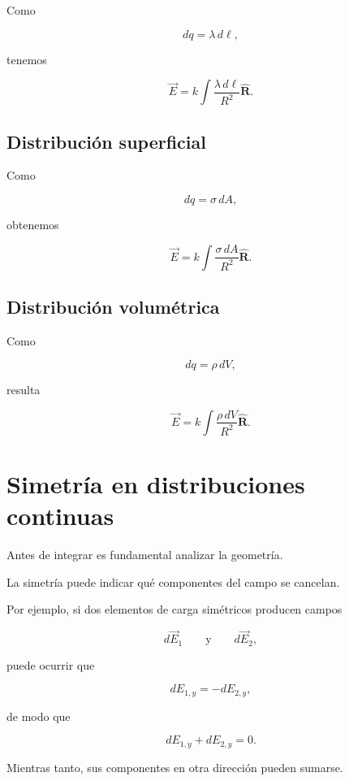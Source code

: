 Como

\[
dq=\lambda\,d\ell,
\]

tenemos

\begin{equation}
\boxed{
\vec E
=
k\int
\frac{\lambda\,d\ell}{R^2}\hat{\mathbf R}
}.
\end{equation}


\subsection{Distribución superficial}

Como

\[
dq=\sigma\,dA,
\]

obtenemos

\begin{equation}
\boxed{
\vec E
=
k\int
\frac{\sigma\,dA}{R^2}\hat{\mathbf R}
}.
\end{equation}


\subsection{Distribución volumétrica}

Como

\[
dq=\rho\,dV,
\]

resulta

\begin{equation}
\boxed{
\vec E
=
k\int
\frac{\rho\,dV}{R^2}\hat{\mathbf R}
}.
\end{equation}


\section{Simetría en distribuciones continuas}

Antes de integrar es fundamental analizar la geometría.

La simetría puede indicar qué componentes del campo se cancelan.

Por ejemplo, si dos elementos de carga simétricos producen campos

\[
d\vec E_1
\qquad\text{y}\qquad
d\vec E_2,
\]

puede ocurrir que

\[
dE_{1,y}=-dE_{2,y},
\]

de modo que

\[
dE_{1,y}+dE_{2,y}=0.
\]

Mientras tanto, sus componentes en otra dirección pueden sumarse.

